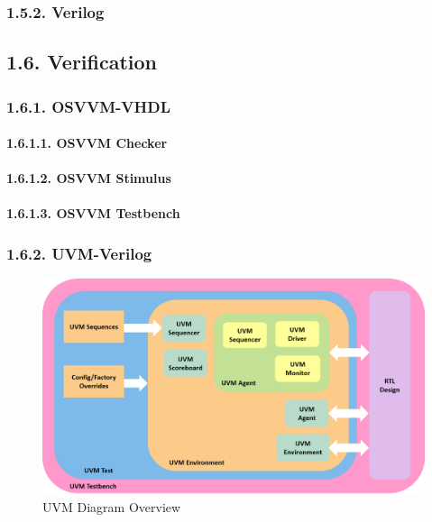\documentclass[]{article}
\let\oldparagraph\paragraph
\renewcommand{\paragraph}[1]{\oldparagraph{#1}\mbox{}}
\begin{document}
\subsubsection{1.5.2. Verilog}\label{verilog-2}

\subsection{1.6. Verification}\label{verification}

\subsubsection{1.6.1. OSVVM-VHDL}\label{osvvm-vhdl}

\paragraph{1.6.1.1. OSVVM Checker}\label{osvvm-checker}

\paragraph{1.6.1.2. OSVVM Stimulus}\label{osvvm-stimulus}

\paragraph{1.6.1.3. OSVVM Testbench}\label{osvvm-testbench}

\subsubsection{1.6.2. UVM-Verilog}\label{uvm-verilog}

\begin{figure}
\centering
\includegraphics{../bench/uvm-testbench.png}
\caption{UVM Diagram Overview}
\end{figure}
\end{document}
